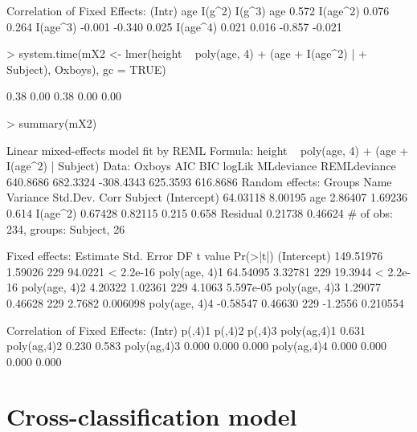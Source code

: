 \documentclass[12pt]{article}
\begin{document}
\begin{Schunk}
\begin{Soutput}
Correlation of Fixed Effects:
         (Intr) age    I(g^2) I(g^3)
age       0.572                     
I(age^2)  0.076  0.264              
I(age^3) -0.001 -0.340  0.025       
I(age^4)  0.021  0.016 -0.857 -0.021
\end{Soutput}
\begin{Sinput}
> system.time(mX2 <- lmer(height ~ poly(age, 4) + (age + I(age^2) | 
+     Subject), Oxboys), gc = TRUE)
\end{Sinput}
\begin{Soutput}
[1] 0.38 0.00 0.38 0.00 0.00
\end{Soutput}
\begin{Sinput}
> summary(mX2)
\end{Sinput}
\begin{Soutput}
Linear mixed-effects model fit by REML
Formula: height ~ poly(age, 4) + (age + I(age^2) | Subject) 
   Data: Oxboys 
      AIC      BIC    logLik MLdeviance REMLdeviance
 640.8686 682.3324 -308.4343   625.3593     616.8686
Random effects:
 Groups   Name        Variance Std.Dev. Corr        
 Subject  (Intercept) 64.03118 8.00195              
          age          2.86407 1.69236  0.614       
          I(age^2)     0.67428 0.82115  0.215 0.658 
 Residual              0.21738 0.46624              
# of obs: 234, groups: Subject, 26

Fixed effects:
               Estimate Std. Error  DF t value  Pr(>|t|)
(Intercept)   149.51976    1.59026 229 94.0221 < 2.2e-16
poly(age, 4)1  64.54095    3.32781 229 19.3944 < 2.2e-16
poly(age, 4)2   4.20322    1.02361 229  4.1063 5.597e-05
poly(age, 4)3   1.29077    0.46628 229  2.7682  0.006098
poly(age, 4)4  -0.58547    0.46630 229 -1.2556  0.210554

Correlation of Fixed Effects:
            (Intr) p(,4)1 p(,4)2 p(,4)3
poly(ag,4)1 0.631                      
poly(ag,4)2 0.230  0.583               
poly(ag,4)3 0.000  0.000  0.000        
poly(ag,4)4 0.000  0.000  0.000  0.000 
\end{Soutput}
\end{Schunk}

\section{Cross-classification model}
\label{sec:CrossClassified}
\end{document}
